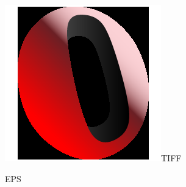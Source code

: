 \documentclass[a4paper]{article}
\begin{document}
\includegraphics[natwidth=128,natheight=128]{opera.tiff}TIFF

EPS
\end{document}
